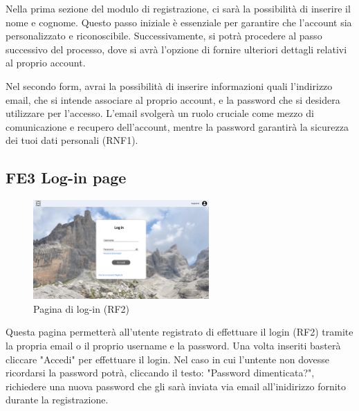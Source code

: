 \documentclass[a4paper,12pt]{article}
\begin{document}
Nella prima sezione del modulo di registrazione, ci sarà la possibilità di inserire il nome e cognome. Questo passo iniziale è essenziale per garantire che l'account sia personalizzato e riconoscibile. Successivamente, si potrà procedere al passo successivo del processo, dove si avrà l'opzione di fornire ulteriori dettagli relativi al proprio account.

Nel secondo form, avrai la possibilità di inserire informazioni quali l'indirizzo email, che si intende associare al proprio account, e la password che si desidera utilizzare per l'accesso. L'email svolgerà un ruolo cruciale come mezzo di comunicazione e recupero dell'account, mentre la password garantirà la sicurezza dei tuoi dati personali (RNF1).





\subsection*{FE3 Log-in page}
\begin{figure}[H]
   \centering
    \includegraphics[width=0.6\textwidth]{img/Log-in.png}
    \caption{Pagina di log-in (RF2)}
\end{figure}
Questa pagina permetterà all'utente registrato di effettuare il login (RF2) tramite la propria email o il proprio username e la password. Una volta inseriti basterà cliccare "Accedi" per effettuare il login. Nel caso in cui l'untente non dovesse ricordarsi la password potrà, cliccando il testo: "Password dimenticata?", richiedere una nuova password che gli sarà inviata via email all'inidirizzo fornito durante la registrazione.
\end{document}

